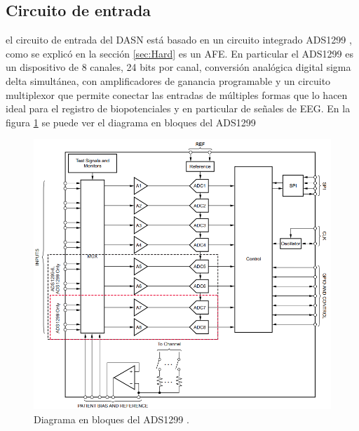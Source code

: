 \vspace{1cm}

\subsection{Circuito de entrada}
el circuito de entrada del DASN está basado en un circuito integrado ADS1299 \citep{PART:ADS1299}, como se explicó en la sección \ref{sec:Hard} es un AFE. En particular el ADS1299 es un dispositivo de 8 canales, 24 bits por canal, conversión analógica digital sigma delta simultánea, con amplificadores de ganancia programable y un circuito multiplexor que permite conectar las entradas de múltiples formas que lo hacen ideal para el registro de biopotenciales y en particular de señales de EEG. En la figura \ref{fig:diagBloquesADS1299} se puede ver el diagrama en bloques del ADS1299

\vspace{1cm}

\begin{figure}[htbp]
	\centering
	\includegraphics[width=1\textwidth]{./Figures/DiagramaEnBloquesADS1299.png}
	\caption{Diagrama en bloques del ADS1299 \protect\footnotemark.}
	\label{fig:diagBloquesADS1299}
\end{figure}

\vspace{1cm}

